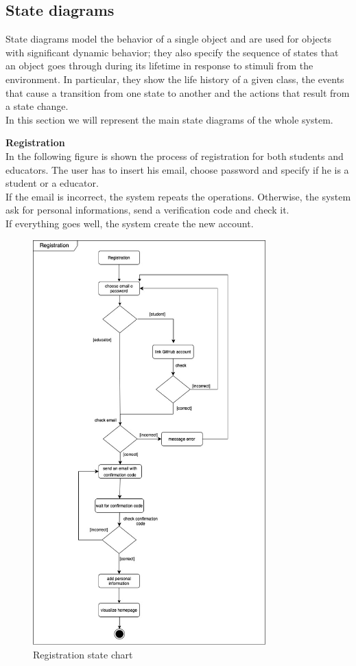 \subsection{State diagrams}
State diagrams model the behavior of a single object and are used for objects with 
significant dynamic behavior; they also specify the sequence of states that an 
object goes through during its lifetime in response to stimuli from the environment.
 In particular, they show the life history of a given class, the events that cause a transition
  from one state to another and the actions that result from a state change.\\
In this section we will represent the main state diagrams of the whole system.

\textbf{Registration}\\
In the following figure is shown the process of registration for both students and educators. 
The user has to insert his email, choose  password and specify if he is a student or a educator.\\
If the email is incorrect, the system repeats the operations. Otherwise, the system ask for personal informations,
 send a verification code and check it.\\If everything goes well, the system create the new account.
\begin{figure} [H]
  \centering
  \includegraphics[width=0.80\textwidth]{images/state_diagrams/Registration.jpg}
  \caption{Registration state chart}
\end{figure} \vspace{1cm}

